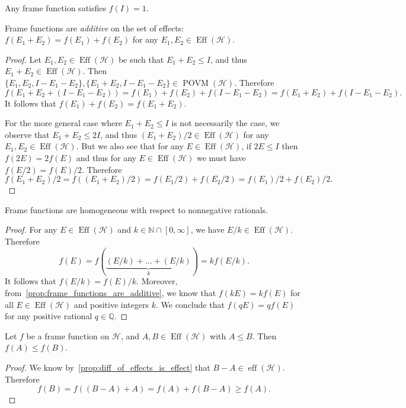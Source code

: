 \documentclass[a4paper]{report}
\newcommand{\NN}{\mathbb{N}}
\newcommand{\QQ}{\mathbb{Q}}
\newcommand{\on}[1]{\operatorname{#1}}
\newcommand{\calH}{{\mathcal{H}}}
\begin{document}
\begin{prop}
	Any frame function satisfies $f(I)=1$.
\end{prop}

\begin{prop}
	Frame functions are \emph{additive} on the set of effects:
	$f(E_1+E_2)=f(E_1)+f(E_2)$ for any $E_1,E_2\in\on{Eff}(\calH)$.
	\label{prop:frame_functions_are_additive}
\end{prop}
\begin{proof}
	Let $E_1,E_2\in\on{Eff}(\calH)$ be such that $E_1+E_2\le I$, and thus $E_1+E_2\in\on{Eff}(\calH)$.
	Then $\{E_1,E_2,I-E_1-E_2\},\{E_1+E_2,I-E_1-E_2\}\in\on{POVM}(\calH)$.
	Therefore
	\begin{equation}
		f(E_1 + E_2 + (I-E_1-E_2))
		= f(E_1) + f(E_2) + f(I-E_1-E_2)
		= f(E_1 + E_2) + f(I-E_1-E_2).
	\end{equation}
	It follows that $f(E_1)+f(E_2)=f(E_1+E_2)$.

	For the more general case where $E_1+E_2\le I$ is not necessarily the case, we observe that $E_1+E_2\le 2I$, and thus $(E_1+E_2)/2\in\on{Eff}(\calH)$ for any $E_1,E_2\in\on{Eff}(\calH)$.
	But we also see that for any $E\in\on{Eff}(\calH)$, if $2E\le I$ then $f(2E)=2f(E)$ and thus for any $E\in\on{Eff}(\calH)$ we must have $f(E/2)=f(E)/2$.
	Therefore
	\begin{equation}
		f(E_1+E_2)/2 = f((E_1+E_2)/2)
		= f(E_1/2) + f(E_2/2)
		= f(E_1)/2 + f(E_2)/2.
	\end{equation}
\end{proof}

\begin{prop}
	Frame functions are homogeneous with respect to nonnegative rationals.
\end{prop}
\begin{proof}
	For any $E\in\on{Eff}(\calH)$ and $k\in\NN\cap[0,\infty]$, we have $E/k\in\on{Eff}(\calH)$.
	Therefore
	\begin{equation}
		f(E) = f(\underbrace{(E/k)+...+(E/k)}_k)
		= k f(E/k).
	\end{equation}
	It follows that $f(E/k)=f(E)/k$.
	Moreover, from~\cref{prop:frame_functions_are_additive}, we know that
	$f(kE)=kf(E)$ for all $E\in\on{Eff}(\calH)$ and positive integers $k$.
	We conclude that $f(qE)=qf(E)$ for any positive rational $q\in\QQ$.
\end{proof}


\begin{prop}
	Let $f$ be a frame function on $\calH$, and $A,B\in\on{Eff}(\calH)$ with $A\le B$. Then $f(A)\le f(B)$.
	\label{prop:frame_functions_are_monotone}
\end{prop}
\begin{proof}
	We know by~\cref{prop:diff_of_effects_is_effect} that $B-A\in\on{eff}(\calH)$.
	Therefore
	\begin{equation}
		f(B) = f((B-A)+A) = f(A) + f(B-A) \ge f(A).
	\end{equation}
\end{proof}
\end{document}
